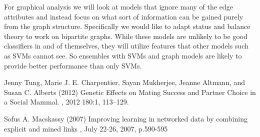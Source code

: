 \documentclass[twoside,twocolumn,paper=letter,fontsize=11pt]{article}
\begin{document}
For graphical analysis we will look at models that ignore many of the edge
attributes and instead focus on what sort of information can be gained purely
from the graph structure. Specifically we would like to adapt status and
balance theory to work on bipartite graphs. While these models are unlikely to
be good classifiers in and of themselves, they will utilize features that other
models such as SVMs cannot see. So ensembles with SVMs and graph models are
likely to provide better performance than only SVMs.


\begin{thebibliography}{99} %

  Jenny Tung, Marie J. E. Charpentier, Sayan Mukherjee, Jeanne Altmann, and Susan C. Alberts (2012)
\newblock 
  Genetic Effects on Mating Success and Partner Choice in a Social Mammal.
, 2012 180:1, 113--129.

Sofus A. Macskassy (2007) 
\newblock
Improving learning in networked data by combining explicit and mined links
, July 22-26, 2007, p.590-595
 
\end{thebibliography}

\end{document}
